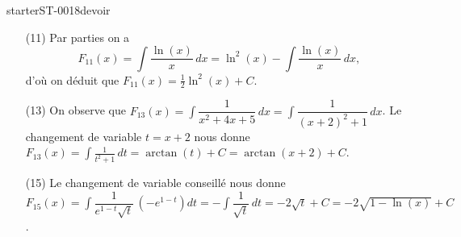 \begin{corrige}{starterST-0018devoir}
\begin{enumerate}

  \item[(11)]  Par parties on a  
    \[
    F_{11}(x)=\displaystyle\int\dfrac{\ln(x)}{x}\, dx = \ln^2(x) -\int\frac{\ln(x)}{x}\, dx,
    \]
d'où on déduit que $F_{11}(x)=\frac{1}{2} \ln^2(x) +C$.
  \item[(13)] On observe que $F_{13}(x)=\displaystyle\int\dfrac{1}{x^2+4x+5}\, dx = \int\dfrac{1}{(x+2)^2+1}\, dx$. Le changement de variable $t = x+2$ nous donne  $\displaystyle F_{13}(x)=\int \frac{1}{t^2 + 1}\, dt = \arctan(t) + C = \arctan(x+2) + C$.
  \item[(15)] Le changement de variable conseillé nous donne $F_{15}(x)=\displaystyle\int \dfrac{1}{e^{1-t}\sqrt{t}}\,(-e^{1-t}) dt = -\int \dfrac{1}{\sqrt{t}}\, dt = -2\sqrt{t} + C = -2\sqrt{1-\ln(x)} + C$.


\end{enumerate}
\end{corrige}
